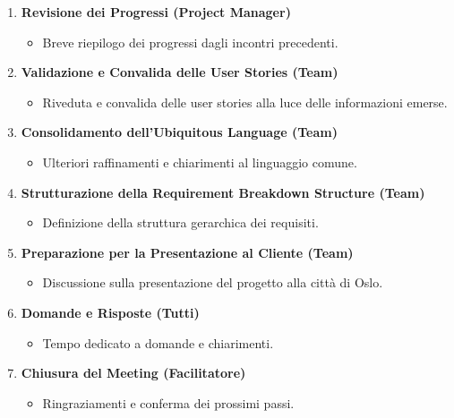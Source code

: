 \begin{enumerate}
    \item \textbf{Revisione dei Progressi (Project Manager)}
          \begin{itemize}
              \item Breve riepilogo dei progressi dagli incontri precedenti.
          \end{itemize}

    \item \textbf{Validazione e Convalida delle User Stories (Team)}
          \begin{itemize}
              \item Riveduta e convalida delle user stories alla luce delle informazioni emerse.
          \end{itemize}

    \item \textbf{Consolidamento dell'Ubiquitous Language (Team)}
          \begin{itemize}
              \item Ulteriori raffinamenti e chiarimenti al linguaggio comune.
          \end{itemize}

    \item \textbf{Strutturazione della Requirement Breakdown Structure (Team)}
          \begin{itemize}
              \item Definizione della struttura gerarchica dei requisiti.
          \end{itemize}

    \item \textbf{Preparazione per la Presentazione al Cliente (Team)}
          \begin{itemize}
              \item Discussione sulla presentazione del progetto alla città di Oslo.
          \end{itemize}

    \item \textbf{Domande e Risposte (Tutti)}
          \begin{itemize}
              \item Tempo dedicato a domande e chiarimenti.
          \end{itemize}

    \item \textbf{Chiusura del Meeting (Facilitatore)}
          \begin{itemize}
              \item Ringraziamenti e conferma dei prossimi passi.
          \end{itemize}
\end{enumerate}

